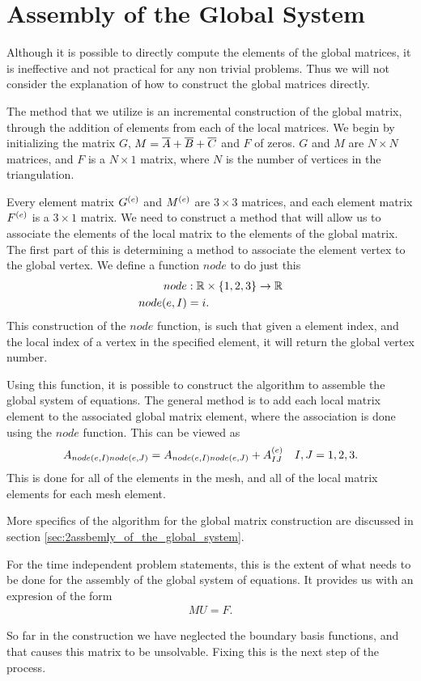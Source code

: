 \documentclass[../fem.tex]{subfile}
\begin{document}
\section{Assembly of the Global System}%
\label{sec:assembly_of_the_global_system}

Although it is possible to directly compute the elements of the global
matrices, it is ineffective and not practical for any non trivial problems.
Thus we will not consider the explanation of how to construct the global
matrices directly.

The method that we utilize is an incremental construction of the global matrix,
through the addition of elements from each of the local matrices. We begin by
initializing the matrix $G$, $M=\overline{A}+\overline{B}+\overline{C}$ and $F$ of zeros. $G$ and
$M$ are $N\times N$ matrices, and $F$ is a $N\times 1$ matrix, where $N$ is the
number of vertices in the triangulation.

Every element matrix $G^{(e)}$ and $M^{(e)}$ are $3\times 3$ matrices, and each element matrix
$F^{(e)}$ is a $3\times 1$ matrix. We need to construct a method that will allow
us to associate the elements of the local matrix to the elements of the global
matrix. The first part of this is determining a method to associate the element
vertex to the global vertex. We define a function $node$ to do just this
\begin{align*}
  node&:\mathbb{R}\times\{1,2,3\}\rightarrow\mathbb{R}\\
  node(e,I)&=i.
\end{align*}
This construction of the $node$ function, is such that given a element index,
and the local index of a vertex in the specified element, it will return the
global vertex number.

Using this function, it is possible to construct the algorithm to assemble the
global system of equations. The general method is to add each local matrix
element to the associated global matrix element, where the association is done
using the $node$ function. This can be viewed as
\begin{align*}
  A_{node(e,I)node(e,J)}=A_{node(e,I)node(e,J)}+A^{(e)}_{IJ}\quad I,J=1,2,3.
\end{align*}
This is done for all of the elements in the mesh, and all of the local matrix
elements for each mesh element.

More specifics of the algorithm for the global matrix construction are
discussed in section \ref{sec:2assbemly_of_the_global_system}.

For the time independent problem statements, this is the extent of what needs
to be done for the assembly of the global system of equations. It provides us
with an expresion of the form
\begin{align*}
   MU=F.
\end{align*}

So far in the construction we have neglected the boundary basis functions, and
that causes this matrix to be unsolvable. Fixing this is the next step of the
process.
\end{document}
